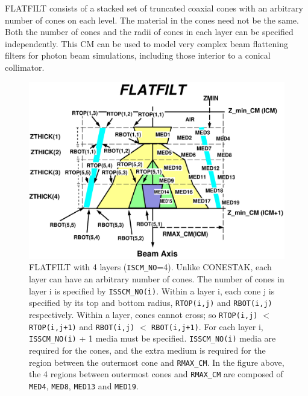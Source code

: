 \documentclass[12pt,twoside]{article}
\begin{document}
FLATFILT consists of a stacked set of truncated coaxial cones with an arbitrary
number of cones on each level.  The material in the cones need not be the same.
Both the number of cones and the radii of cones in each layer can be specified
independently.  This CM can be used to model very complex beam flattening
filters for photon beam simulations, including those interior to a conical
collimator.
\begin{figure}[h]
\begin{center}
\leavevmode
\mbox{}\hspace{0cm}
\includegraphics[width=16cm]{figures/flatfiltd}
\caption[FLATFILT CM geometry]
{FLATFILT with 4 layers ({\tt ISCM\_NO}=4).  Unlike CONESTAK, each layer can
have an arbitrary number of cones.  The number of cones in layer i is
specified by {\tt ISSCM\_NO(i)}.  Within a layer i, each cone j is specified by
its top and bottom radius, {\tt RTOP(i,j)} and {\tt RBOT(i,j)} respectively.  Within
a layer, cones cannot cross; so {\tt RTOP(i,j)} $<$ {\tt RTOP(i,j+1)} and
{\tt RBOT(i,j)} $<$ {\tt RBOT(i,j+1)}.  For each layer i, {\tt ISSCM\_NO(i)} + 1 media must be
specified.  {\tt ISSCM\_NO(i)} media are required for the cones, and the extra
medium is required for the region between the outermost cone and
{\tt RMAX\_CM}.  In the figure above, the 4 regions between outermost cones and
{\tt RMAX\_CM} are composed of {\tt MED4}, {\tt MED8}, {\tt MED13} and {\tt MED19}.}
\label{fig_FLATFILTD}
\end{center}
\end{figure}


\clearpage

\begin{small}

\end{small}
\end{document}
